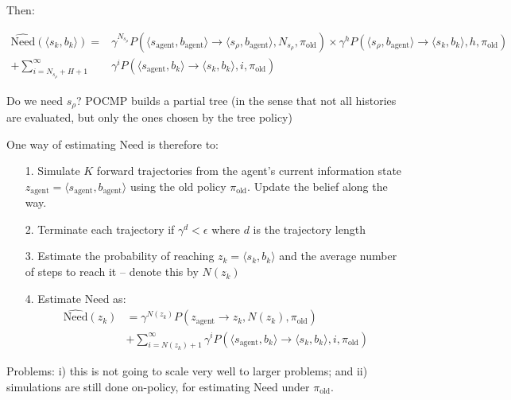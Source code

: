 \documentclass{article}
\begin{document}
\bigbreak 

Then:

\begin{align*}
\widehat{\text{Need}}(\langle s_k, b_k \rangle) = &\gamma^{N_{s_\rho}} P(\langle s_{\text{agent}}, b_{\text{agent}} \rangle \rightarrow \langle s_\rho, b_{\text{agent}} \rangle, N_{s_\rho}, \pi_{\text{old}}) \times \gamma^h P(\langle s_\rho, b_{\text{agent}} \rangle \rightarrow  \langle s_k, b_k \rangle, h, \pi_{\text{old}})\\
+ \sum_{i=N_{s_\rho}+H+1}^{\infty} &\gamma^i P(\langle s_{\text{agent}}, b_k \rangle \rightarrow \langle s_k, b_k \rangle, i, \pi_{\text{old}})
\end{align*}

\clearpage
Do we need $s_\rho$? POCMP builds a partial tree (in the sense that not all histories are evaluated, but 
only the ones chosen by the tree policy)

\bigbreak

One way of estimating Need is therefore to:
\begin{itemize}
    \item[1.] Simulate $K$ forward trajectories from the agent's current information state $z_\text{agent}= \langle s_\text{agent}, b_\text{agent}\rangle$ using the old policy $\pi_\text{old}$. Update the belief along the way.
    \item[2.] Terminate each trajectory if $\gamma^{d} < \epsilon$ where $d$ is the trajectory length
    \item[3.] Estimate the probability of reaching $z_k= \langle s_k, b_k\rangle$ and the average number of steps to reach it -- denote this by $N(z_k)$
    \item[4.] Estimate Need as:
    \begin{align*}
        \widehat{\text{Need}}(z_k) &= \gamma^{N(z_k)}P(z_\text{agent} \rightarrow z_k, N(z_k), \pi_\text{old})\\
        &+ \sum_{i=N(z_k)+1}^{\infty} \gamma^i P(\langle s_\text{agent}, b_k\rangle \rightarrow \langle s_k, b_k \rangle, i, \pi_\text{old})
    \end{align*}
\end{itemize}

Problems: i) this is not going to scale very well to larger problems; and ii) simulations are still done on-policy, for 
estimating Need under $\pi_\text{old}$.
\end{document}
